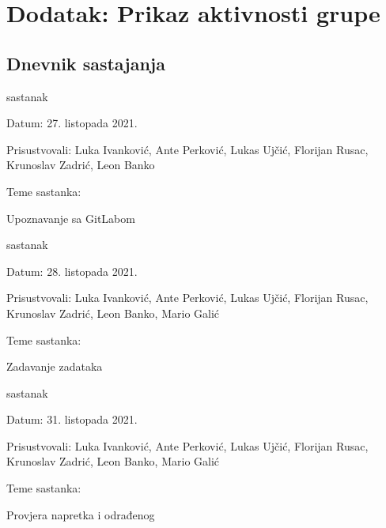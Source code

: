 \chapter*{Dodatak: Prikaz aktivnosti grupe}
		
		\section*{Dnevnik sastajanja}
		
		\begin{packed_enum}
			\item  sastanak
			
			\item[] \begin{packed_item}
				\item Datum: 27. listopada 2021.
				\item Prisustvovali: Luka Ivanković, Ante Perković, Lukas Ujčić, Florijan Rusac, Krunoslav Zadrić, Leon Banko
				\item Teme sastanka:
				\begin{packed_item}
					\item  Upoznavanje sa GitLabom
				\end{packed_item}
			\end{packed_item}
			
			\item  sastanak
			\item[] \begin{packed_item}
				\item Datum: 28. listopada 2021.
				\item Prisustvovali: Luka Ivanković, Ante Perković, Lukas Ujčić, Florijan Rusac, Krunoslav Zadrić, Leon Banko, Mario Galić 
				\item Teme sastanka:
				\begin{packed_item}
					\item  Zadavanje zadataka
				\end{packed_item}
			\end{packed_item}

			\item  sastanak
			\item[] \begin{packed_item}
				\item Datum: 31. listopada 2021.
				\item Prisustvovali: Luka Ivanković, Ante Perković, Lukas Ujčić, Florijan Rusac, Krunoslav Zadrić, Leon Banko, Mario Galić 
				\item Teme sastanka:
				\begin{packed_item}
					\item  Provjera napretka i odrađenog
				\end{packed_item}
			\end{packed_item}


\end{packed_enum}
